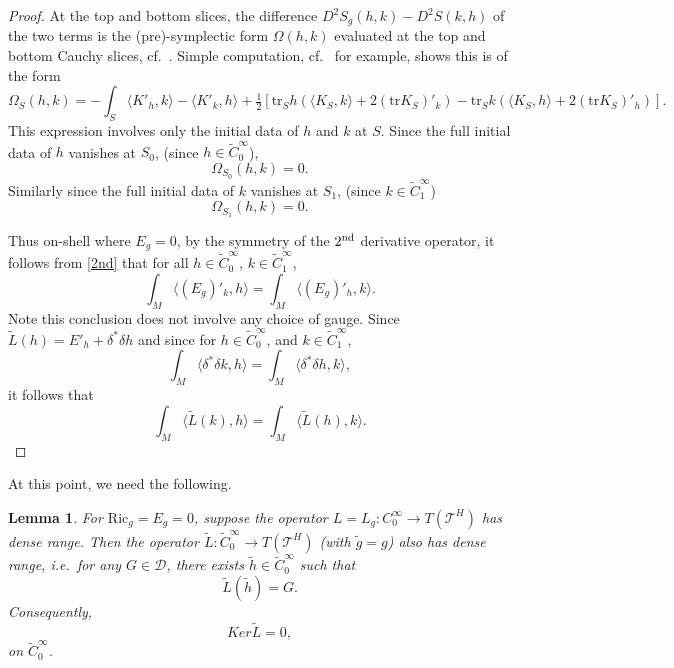 \documentclass[10pt]{amsart}
\renewcommand{\d}{\delta}
\renewcommand{\O}{\Omega}
\newcommand{\cT}{{\mathcal T}}
\newcommand{\cD}{{\mathcal D}}
\newcommand{\Ric}{\mathrm{Ric}}
\newcommand{\be}{\begin{equation}}
\newcommand{\ee}{\end{equation}}
\newcommand{\tr}{\mathrm{tr}}
\renewcommand{\to}{\rightarrow}
\newcommand{\<}{\langle}
\renewcommand{\>}{\rangle}
\newcommand{\w}{\widetilde}
\theoremstyle{plain}
\newtheorem{lemma}{Lemma}[section]
\theoremstyle{remark}
\theoremstyle{definition}
\numberwithin{equation}{section}
\begin{document}
\begin{proof}
  At the top and bottom slices, the difference $D^2 S_g(h, k) - D^2 S(k, h)$ of the two terms is the (pre)-symplectic form $\O(h, k)$ evaluated at the 
top and bottom Cauchy slices, cf.~\cite{HW}. Simple computation, cf.~\cite{AA2} for example, shows this is of the form 
$$\O_S(h,k) = -\int_S \<K'_h, k\> - \<K'_k, h\> + \tfrac{1}{2}[\tr_S h(\<K_S, k\> + 2(\tr K_S)'_k) - \tr_S k(\<K_S, h\> + 2(\tr K_S)'_h)]. $$
This expression involves only the initial data of $h$ and $k$ at $S$. Since the full initial data of 
$h$ vanishes at $S_0$, (since $h \in \w C^{\infty}_0$), 
$$\O_{S_0}(h, k) = 0.$$
Similarly since the full initial data of $k$ vanishes at $S_1$, (since $k \in \w C^{\infty}_1$)
$$\O_{S_1}(h, k) = 0.$$

  Thus on-shell where $E_g = 0$, by the symmetry of the $2^{\rm nd}$ derivative operator, it follows from \eqref{2nd} that for all 
  $h \in \w C^{\infty}_0$, $k \in \w C^{\infty}_1$, 
$$\int_M \<(E_g)'_k, h\> = \int_M \<(E_g)'_h, k\>.$$
Note this conclusion does not involve any choice of gauge. Since $\w L(h) = E'_h + \d^* \d h$ and since for $h \in \w C^{\infty}_0$, 
and $k \in \w C^{\infty}_1$, 
$$\int_M \<\d^* \d k, h\> = \int_M \<\d^* \d h, k\>,$$
it follows that 
$$\int_M \<\w L(k), h\> = \int_M \<\w L(h), k\>.$$

\end{proof}

  At this point, we need the following. 
\begin{lemma}\label{gshift}
For $\Ric_g = E_g = 0$, suppose the operator $L = L_g: C^{\infty}_0 \to T(\cT^H)$ has dense range. Then the operator $\w L: \w C^{\infty}_0 
\to T(\cT^H)$ (with $\w g = g$) also has dense range, i.e.~for any $G \in \cD$, there exists $\w h \in \w C^{\infty}_0$ such that 
$$\w L(\w h) = G.$$
Consequently, 
\be \label{KwL}
Ker \w L = 0,
\ee
on $\w C^{\infty}_0$. 
\end{lemma}
\end{document}
